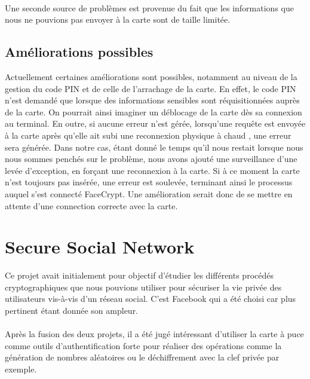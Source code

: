 \documentclass[a4paper,11pt,french]{article}
\begin{document}
\paragraph{}
Une seconde source de problèmes est provenue du fait que les informations que nous
ne pouvions pas envoyer à la carte sont de taille limitée. 



\subsection{Améliorations possibles}
Actuellement certaines améliorations sont possibles, notamment au niveau
de la gestion du code PIN et de celle de l'arrachage de la carte. En effet,
le code PIN n'est demandé que lorsque des informations sensibles sont
réquisitionnées auprès de la carte. On pourrait ainsi imaginer un déblocage
de la carte dès sa connexion au terminal. En outre, si aucune erreur n'est gérée,
lorsqu'une requête est envoyée à la carte après qu'elle ait subi une reconnexion
physique \og à chaud \fg{}, une erreur sera générée. Dans notre cas, étant donné
le temps qu'il nous restait lorsque nous nous sommes penchés sur le problème, 
nous avons ajouté une surveillance d'une levée d'exception, en forçant une 
reconnexion à la carte. Si à ce moment la carte n'est toujours pas insérée,
une erreur est soulevée, terminant ainsi le processus auquel s'est connecté
FaceCrypt. Une amélioration serait donc de se mettre en attente d'une connection
correcte avec la carte.



\clearpage

\section{Secure Social Network}
Ce projet avait initialement pour objectif d'étudier les différents 
procédés cryptographiques que nous pouvions utiliser pour sécuriser la vie
privée des utilisateurs vis-à-vis d'un réseau social. C'est Facebook qui a 
été choisi car plus pertinent étant donnée son ampleur.

\paragraph{}
Après la fusion des deux projets, il a été jugé intéressant d'utiliser 
la carte à puce comme outils d'authentification forte pour réaliser des 
opérations comme la génération de nombres aléatoires ou le déchiffrement 
avec la clef privée par exemple.
\end{document}
